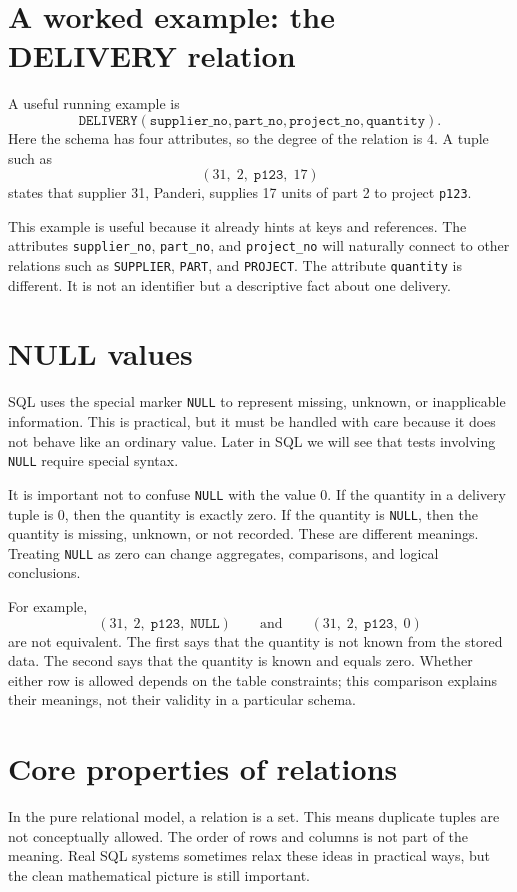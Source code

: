 \documentclass[11pt,a4paper,openany]{book}
\begin{document}
\section{A worked example: the DELIVERY relation}
A useful running example is
\[
\texttt{DELIVERY}(\texttt{supplier\_no},\texttt{part\_no},\texttt{project\_no},\texttt{quantity}).
\]
Here the schema has four attributes, so the degree of the relation is \(4\). A tuple such as
\[
(31,\;2,\;\texttt{p123},\;17)
\]
states that supplier 31, Panderi, supplies 17 units of part 2 to project \texttt{p123}.

This example is useful because it already hints at keys and references. The attributes \texttt{supplier\_no}, \texttt{part\_no}, and \texttt{project\_no} will naturally connect to other relations such as \texttt{SUPPLIER}, \texttt{PART}, and \texttt{PROJECT}. The attribute \texttt{quantity} is different. It is not an identifier but a descriptive fact about one delivery.

\section{NULL values}
SQL uses the special marker \texttt{NULL} to represent missing, unknown, or inapplicable information. This is practical, but it must be handled with care because it does not behave like an ordinary value. Later in SQL we will see that tests involving \texttt{NULL} require special syntax.

It is important not to confuse \texttt{NULL} with the value \(0\). If the quantity in a delivery tuple is \(0\), then the quantity is exactly zero. If the quantity is \texttt{NULL}, then the quantity is missing, unknown, or not recorded. These are different meanings. Treating \texttt{NULL} as zero can change aggregates, comparisons, and logical conclusions.

For example,
\[
(31,\;2,\;\texttt{p123},\;\texttt{NULL})
\qquad\text{and}\qquad
(31,\;2,\;\texttt{p123},\;0)
\]
are not equivalent. The first says that the quantity is not known from the stored data. The second says that the quantity is known and equals zero. Whether either row is allowed depends on the table constraints; this comparison explains their meanings, not their validity in a particular schema.

\section{Core properties of relations}
In the pure relational model, a relation is a set. This means duplicate tuples are not conceptually allowed. The order of rows and columns is not part of the meaning. Real SQL systems sometimes relax these ideas in practical ways, but the clean mathematical picture is still important.
\end{document}
